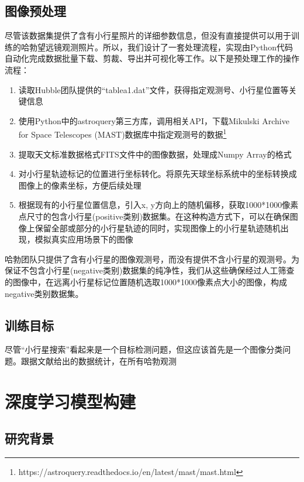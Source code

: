 \documentclass[12pt,a4paper]{article}%
\begin{document}
\subsection{图像预处理}

尽管该数据集提供了含有小行星照片的详细参数信息，但没有直接提供可以用于训练的哈勃望远镜观测照片。所以，我们设计了一套处理流程，实现由Python代码自动化完成数据批量下载、剪裁、导出并可视化等工作。以下是预处理工作的操作流程：

\begin{enumerate}[1.]%
    \item 读取Hubble团队提供的“tablea1.dat”文件，获得指定观测号、小行星位置等关键信息
    \item 使用Python中的astroquery第三方库，调用相关API，下载Mikulski Archive for Space Telescopes (MAST)数据库中指定观测号的数据\footnote{https://astroquery.readthedocs.io/en/latest/mast/mast.html}
    \item 提取天文标准数据格式FITS文件中的图像数据，处理成Numpy Array的格式
    \item 对小行星轨迹标记的位置进行坐标转化。将原先天球坐标系统中的坐标转换成图像上的像素坐标，方便后续处理
    \item 根据现有的小行星位置信息，引入x, y方向上的随机偏移，获取1000*1000像素点尺寸的包含小行星(positive类别)数据集。在这种构造方式下，可以在确保图像上保留全部或部分的小行星轨迹的同时，实现图像上的小行星轨迹随机出现，模拟真实应用场景下的图像
\end{enumerate}

哈勃团队只提供了含有小行星的图像观测号，而没有提供不含小行星的观测号。为保证不包含小行星(negative类别)数据集的纯净性，我们从这些确保经过人工筛查的图像中，在远离小行星标记位置随机选取1000*1000像素点大小的图像，构成negative类别数据集。

\subsection{训练目标}

尽管“小行星搜索”看起来是一个目标检测问题，但这应该首先是一个图像分类问题。跟据文献给出的数据统计，在所有哈勃观测

\section{深度学习模型构建}

\subsection{研究背景}
\end{document}
